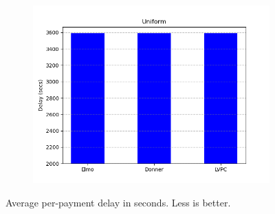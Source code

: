 \begin{figure}
\begin{subfigure}{.3293\textwidth}
  \includegraphics[width=\textwidth]{../simulation/Delays_uniform.png}
  \end{subfigure}
  \caption{Average per-payment delay in seconds. Less is better.}
  \label{graph:delays}
  \end{figure}
